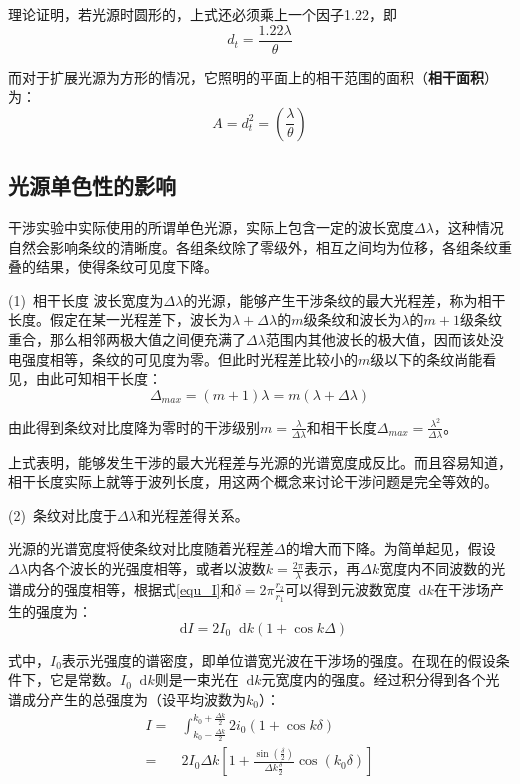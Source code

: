 \documentclass[UTF8]{ctexart}
\newcommand*{\dif}{\mathop{}\!\mathrm{d}}
\begin{document}
	理论证明，若光源时圆形的，上式还必须乘上一个因子1.22，即
	\begin{equation}
		d_{t}=\frac{1.22 \lambda}{\theta}
	\end{equation}
	
	而对于扩展光源为方形的情况，它照明的平面上的相干范围的面积（\textbf{相干面积}）为：
	\begin{equation}
		A=d_{t}^{2}=\left(\frac{\lambda}{\theta}\right)
	\end{equation}
	
	\subsection{光源单色性的影响}
	干涉实验中实际使用的所谓单色光源，实际上包含一定的波长宽度$ \Delta \lambda $，这种情况自然会影响条纹的清晰度。各组条纹除了零级外，相互之间均为位移，各组条纹重叠的结果，使得条纹可见度下降。
	
	(1)\ 相干长度
	波长宽度为$ \Delta \lambda $的光源，能够产生干涉条纹的最大光程差，称为相干长度。假定在某一光程差下，波长为$ \lambda+\Delta \lambda $的$ m $级条纹和波长为$ \lambda $的$ m+1 $级条纹重合，那么相邻两极大值之间便充满了$ \Delta \lambda $范围内其他波长的极大值，因而该处没电强度相等，条纹的可见度为零。但此时光程差比较小的$ m $级以下的条纹尚能看见，由此可知相干长度：
	\begin{equation}
		\Delta_{max}=(m+1)\lambda=m(\lambda+\Delta \lambda)
	\end{equation}
	
\noindent 由此得到条纹对比度降为零时的干涉级别$ m=\frac{\lambda}{\Delta \lambda} $和相干长度$ \Delta_{max}=\frac{\lambda^{2}}{\Delta \lambda} $。

	上式表明，能够发生干涉的最大光程差与光源的光谱宽度成反比。而且容易知道，相干长度实际上就等于波列长度，用这两个概念来讨论干涉问题是完全等效的。
	
	(2)\ 条纹对比度于$ \Delta \lambda $和光程差得关系。
	
	光源的光谱宽度将使条纹对比度随着光程差$ \Delta  $的增大而下降。为简单起见，假设$ \Delta \lambda $内各个波长的光强度相等，或者以波数$ k=\frac{2 \pi}{\lambda} $表示，再$ \Delta k $宽度内不同波数的光谱成分的强度相等，根据式\ref{equ_I}和$ \delta =2 \pi \frac{r_{2}}{r_{1}} $可以得到元波数宽度$ \dif k $在干涉场产生的强度为：
	\begin{equation}
		\dif I=2 I_{0} \dif k (1+\cos k \Delta)
	\end{equation}
	
\noindent 式中，$ I_{0} $表示光强度的谱密度，即单位谱宽光波在干涉场的强度。在现在的假设条件下，它是常数。$ I_{0} \dif k $则是一束光在$ \dif k $元宽度内的强度。经过积分得到各个光谱成分产生的总强度为（设平均波数为$ k_{0} $）：
\begin{equation}
	\begin{aligned}
		I=&\int_{k_{0}-\frac{\Delta k}{2}}^{k_{0}+\frac{\Delta k}{2}} 2 i_{0} (1+\cos k \delta)\\
		=&2 I_{0} \Delta k \left[1+\frac{\sin \left(\frac{\delta}{2}\right)}{\Delta k \frac{\delta}{2}} \cos(k_{0} \delta)\right]
	\end{aligned}
\end{equation}
\end{document}
